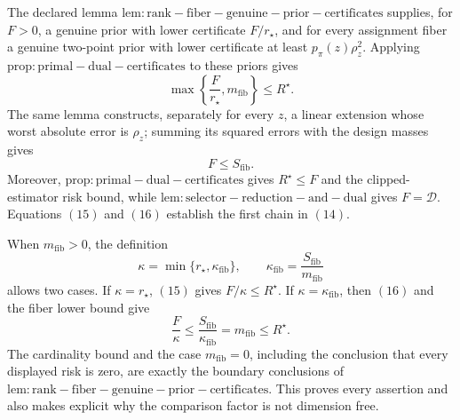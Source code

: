 The declared lemma \(\mathrm{lem:rank-fiber-genuine-prior-certificates}\) supplies, for \(F>0\), a genuine prior with lower certificate \(F/r_{\star}\), and for every assignment fiber a genuine two-point prior with lower certificate at least \(p_\pi(z)\rho_z^2\).  Applying \(\mathrm{prop:primal-dual-certificates}\) to these priors gives
\[
 \max\left\{\frac{F}{r_{\star}},m_{\mathrm{fib}}\right\}\le R^{\star}.          \tag{15}
\]
The same lemma constructs, separately for every \(z\), a linear extension whose worst absolute error is \(\rho_z\); summing its squared errors with the design masses gives
\[
 F\le S_{\mathrm{fib}}.                                                           \tag{16}
\]
Moreover, \(\mathrm{prop:primal-dual-certificates}\) gives \(R^{\star}\le F\) and the clipped-estimator risk bound, while \(\mathrm{lem:selector-reduction-and-dual}\) gives \(F=\mathcal D\).  Equations \((15)\) and \((16)\) establish the first chain in \((14)\).

When \(m_{\mathrm{fib}}>0\), the definition
\[
 \kappa=\min\{r_{\star},\kappa_{\mathrm{fib}}\},
 \qquad
 \kappa_{\mathrm{fib}}=\frac{S_{\mathrm{fib}}}{m_{\mathrm{fib}}}
\]
allows two cases.  If \(\kappa=r_{\star}\), \((15)\) gives \(F/\kappa\le R^{\star}\).  If \(\kappa=\kappa_{\mathrm{fib}}\), then \((16)\) and the fiber lower bound give
\[
 \frac{F}{\kappa}
 \le\frac{S_{\mathrm{fib}}}{\kappa_{\mathrm{fib}}}
 =m_{\mathrm{fib}}
 \le R^{\star}.
\]
The cardinality bound and the case \(m_{\mathrm{fib}}=0\), including the conclusion that every displayed risk is zero, are exactly the boundary conclusions of \(\mathrm{lem:rank-fiber-genuine-prior-certificates}\).  This proves every assertion and also makes explicit why the comparison factor is not dimension free.